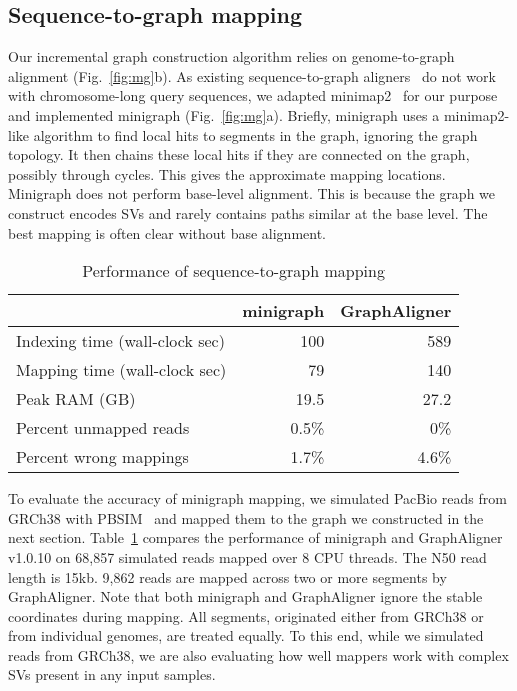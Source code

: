 \documentclass[twocolumn]{bmcart}
\begin{document}
\subsection*{Sequence-to-graph mapping}

Our incremental graph construction algorithm relies on genome-to-graph
alignment (Fig.~\ref{fig:mg}b). As existing sequence-to-graph
aligners~\cite{Garrison:2018aa,Rautiainen810812} do not work with
chromosome-long query sequences, we adapted minimap2~\cite{Li:2018ab} for our
purpose and implemented minigraph (Fig.~\ref{fig:mg}a). Briefly, minigraph uses
a minimap2-like algorithm to find local hits to segments in the graph, ignoring
the graph topology. It then chains these local hits if they are connected on
the graph, possibly through cycles. This gives the approximate mapping locations. Minigraph does not
perform base-level alignment. This is because the graph we construct encodes
SVs and rarely contains paths similar at the base level. The best mapping is
often clear without base alignment.

\begin{table}[b]
\caption{Performance of sequence-to-graph mapping}\label{tab:mgvga}
\begin{tabular}{lrr}
\hline
& minigraph & GraphAligner \\
\hline
Indexing time (wall-clock sec) & 100 & 589 \\
Mapping time (wall-clock sec) & 79 & 140 \\
Peak RAM (GB)          & 19.5 & 27.2 \\
Percent unmapped reads & 0.5\% & 0\% \\
Percent wrong mappings & 1.7\% & 4.6\% \\
\hline
\end{tabular}
\end{table}

To evaluate the accuracy of minigraph mapping, we simulated PacBio reads from
GRCh38 with PBSIM~\cite{Ono:2013aa} and mapped them to the graph we constructed
in the next section. Table~\ref{tab:mgvga} compares the performance of
minigraph and GraphAligner~\cite{Rautiainen810812} v1.0.10 on 68,857 simulated
reads mapped over 8 CPU threads. {\color{blue} The N50 read length is 15kb.
9,862 reads are mapped across two or more segments by GraphAligner. Note that
both minigraph and GraphAligner ignore the stable coordinates during mapping.
All segments, originated either from GRCh38 or from individual genomes, are
treated equally. To this end, while we simulated reads from GRCh38, we are also
evaluating how well mappers work with complex SVs present in any input
samples.}
\end{document}
